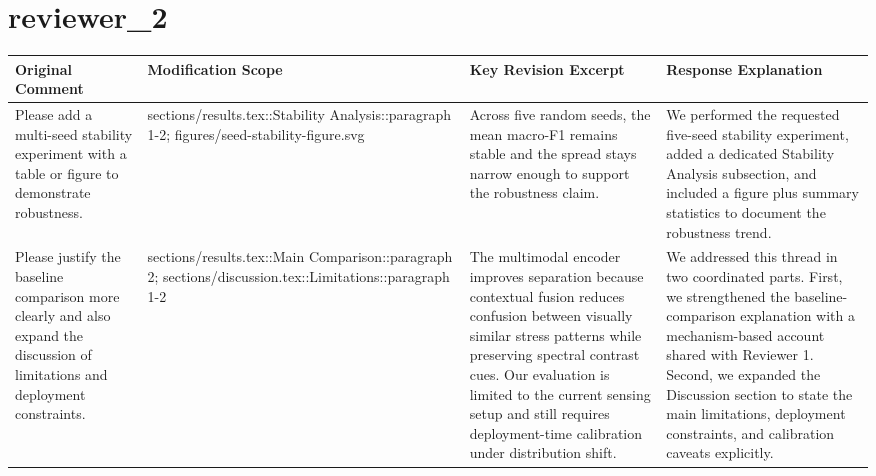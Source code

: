 \documentclass{article}
\begin{document}
\section*{ reviewer\_2 }
\begin{longtable}{|p{}|p{}|p{}|p{}|}
\hline
Original Comment & Modification Scope & Key Revision Excerpt & Response Explanation \\
\hline
Please add a multi-seed stability experiment with a table or figure to demonstrate robustness. & sections/results.tex::Stability Analysis::paragraph 1-2; figures/seed-stability-figure.svg & Across five random seeds, the mean macro-F1 remains stable and the spread stays narrow enough to support the robustness claim. & We performed the requested five-seed stability experiment, added a dedicated Stability Analysis subsection, and included a figure plus summary statistics to document the robustness trend. \\
\hline
Please justify the baseline comparison more clearly and also expand the discussion of limitations and deployment constraints. & sections/results.tex::Main Comparison::paragraph 2; sections/discussion.tex::Limitations::paragraph 1-2 & The multimodal encoder improves separation because contextual fusion reduces confusion between visually similar stress patterns while preserving spectral contrast cues. Our evaluation is limited to the current sensing setup and still requires deployment-time calibration under distribution shift. & We addressed this thread in two coordinated parts. First, we strengthened the baseline-comparison explanation with a mechanism-based account shared with Reviewer 1. Second, we expanded the Discussion section to state the main limitations, deployment constraints, and calibration caveats explicitly. \\
\hline
\end{longtable}
\end{document}

